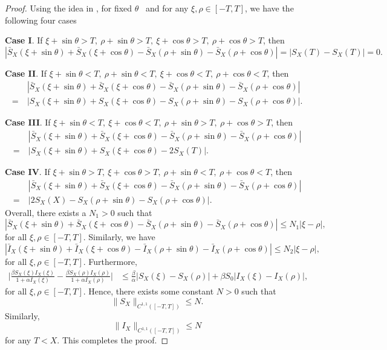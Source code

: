 \documentclass[final,3p,times]{elsarticle}
\numberwithin{equation}{section}
\begin{document}
\begin{proof}
Using the idea in \cite{ZhangWuIJB2019}, for fixed \(\theta\) ~and for any \(\xi, \rho \in  [-T, T]\), we have the following four cases

\textbf{Case I}. If $\xi+ \sin\theta>T,\ \rho+ \sin\theta>T,\ \xi+\cos\theta>T,\ \rho + \cos\theta> T$, then
\[
|\bar{S}_X(\xi + \sin\theta)+\bar{S}_X(\xi + \cos\theta)
-\bar{S}_X(\rho + \sin\theta)-\bar{S}_X(\rho + \cos\theta)|
=
|S_X(T)-S_X(T)| = 0.
\]

\textbf{Case II}. If $\xi+ \sin\theta<T,\ \rho+ \sin\theta<T,\ \xi+\cos\theta<T,\ \rho + \cos\theta<T$, then
\begin{align*}
&\ |\bar{S}_X(\xi + \sin\theta)+\bar{S}_X(\xi + \cos\theta)
-\bar{S}_X(\rho + \sin\theta)-\bar{S}_X(\rho + \cos\theta)|\\
=
&\ |{S}_X(\xi + \sin\theta)+{S}_X(\xi + \cos\theta)-{S}_X(\rho + \sin\theta)-{S}_X(\rho + \cos\theta)|.
\end{align*}

\textbf{Case III}. If $\xi + \sin\theta < T,\ \xi+\cos\theta < T,\ \rho +\sin\theta> T,\ \rho+\cos\theta > T$, then
\begin{align*}
&\ |\bar{S}_X(\xi + \sin\theta)+\bar{S}_X(\xi + \cos\theta)
-\bar{S}_X(\rho + \sin\theta)-\bar{S}_X(\rho + \cos\theta)|\\
=
&\ |{S}_X(\xi + \sin\theta)+{S}_X(\xi + \cos\theta)-2 S_X(T)|.
\end{align*}

\textbf{Case IV}. If $\xi + \sin\theta > T,\ \xi+\cos\theta > T,\ \rho +\sin\theta< T,\ \rho+\cos\theta < T$, then
\begin{align*}
&\ |\bar{S}_X(\xi + \sin\theta)+\bar{S}_X(\xi + \cos\theta)
-\bar{S}_X(\rho + \sin\theta)-\bar{S}_X(\rho + \cos\theta)|\\
=
&\ |2S_X(X)-{S}_X(\rho + \sin\theta)-{S}_X(\rho + \cos\theta)|.
\end{align*}
Overall, there exists a $N_1>0$ such that 
\[
|\bar{S}_X(\xi + \sin\theta)+\bar{S}_X(\xi + \cos\theta)
-\bar{S}_X(\rho + \sin\theta)-\bar{S}_X(\rho + \cos\theta)|\leq N_1|\xi - \rho|,
\]
for all \(\xi, \rho \in  [-T, T]\). Similarly, we have
\[
|\bar{I}_X(\xi + \sin\theta)+\bar{I}_X(\xi + \cos\theta)
-\bar{I}_X(\rho + \sin\theta)-\bar{I}_X(\rho + \cos\theta)|\leq N_2|\xi - \rho|,
\]
for all \(\xi, \rho \in  [-T, T]\). Furthermore,
\begin{align*}
 \Big|\displaystyle\frac{\beta S_{X}(\xi)I_{X}(\xi)}{1+\alpha I_{X}(\xi)} -\displaystyle\frac{\beta S_{X}(\rho)I_{X}(\rho)}{1+\alpha I_{X}(\rho)} \Big| %
&\leq {\frac{\beta}{\alpha}}|S_X(\xi)-S_X(\rho)|+\beta S_{0}|I_X(\xi)-I_X(\rho)|,
\end{align*}
for all \(\xi, \rho \in  [-T, T]\). Hence, there exists some constant \(N>0\) such that
\[
\|S_X\|_{C^{1,1}( [-T, T])} \leq N.
\]
Similarly,
\[
\|I_X\|_{C^{1,1}( [-T, T])} \leq N
\]
for any \(T < X\). This completes the proof.
\end{proof}
\end{document}
